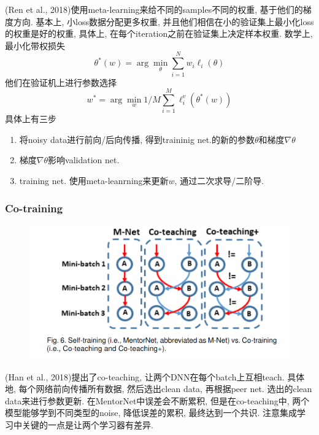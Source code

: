 \documentclass{article}
\begin{document}
(Ren et al., 2018)使用meta-learning来给不同的samples不同的权重, 基于他们的梯度方向. 基本上, 小loss数据分配更多权重, 并且他们相信在小的验证集上最小化loss的权重是好的权重, 具体上, 在每个iteration之前在验证集上决定样本权重. 数学上, 最小化带权损失
\begin{equation}
    \theta^{*}(w)=\arg \min _{\theta} \sum_{i=1}^{N} w_{i} \ell_{i}(\theta)
\end{equation}  
他们在验证机上进行参数选择
\begin{equation}
    w^{*}=\arg \min _{w} 1 / M \sum_{i=1}^{M} \ell_{i}^{v}\left(\theta^{*}(w)\right)
\end{equation}
具体上有三步
\begin{enumerate}
    \item 将noisy data进行前向/后向传播, 得到traininig net.的新的参数$\theta$和梯度$\nabla \theta$
    \item 梯度$\nabla \theta$影响validation net.
    \item training net. 使用meta-leanrning来更新$w$, 通过二次求导/二阶导.
\end{enumerate}

\subsubsection{Co-training}
\begin{figure}[htbp]
    \centering
    \includegraphics[width=0.7\paperwidth]{cotraining.PNG}
\end{figure}

(Han et al., 2018)提出了co-teaching, 让两个DNN在每个batch上互相teach. 具体地, 每个网络前向传播所有数据, 然后选出clean data, 再根据peer net. 选出的clean data来进行参数更新. 在MentorNet中误差会不断累积, 但是在co-teaching中, 两个模型能够学到不同类型的noise, 降低误差的累积, 最终达到一个共识. 注意集成学习中关键的一点是让两个学习器有差异.
\end{document}
